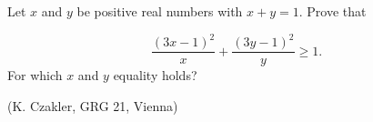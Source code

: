 Let $x$ and $y$ be  positive real numbers with $x + y =1 $. Prove that

\[
\dfrac{(3x-1)^2}{x}+ \dfrac{(3y-1)^2}{y} \ge1.
\]For which $x$ and $y$ equality holds?

(K. Czakler, GRG 21, Vienna)
